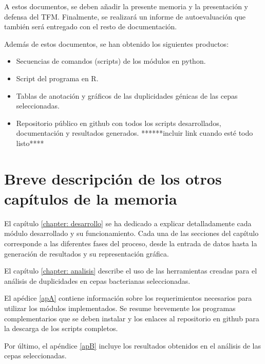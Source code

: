 A estos documentos, se deben añadir la presente memoria y la presentación y defensa del TFM. Finalmente, se realizará un informe de autoevaluación que también será entregado con el resto de documentación.

Además de estos documentos, se han obtenido los siguientes productos:

\begin{itemize}
    \item Secuencias de comandos (scripts) de los módulos en python.
    \item Script del programa en R.
    \item Tablas de anotación y gráficos de las duplicidades génicas de las cepas seleccionadas.
    \item Repositorio público en github con todos los scripts desarrollados, documentación y resultados generados. ******incluir link cuando esté todo listo****
\end{itemize}

\section{Breve descripción de los otros capítulos de la memoria}
El capítulo \ref{chapter: desarrollo} se ha dedicado a explicar detalladamente cada módulo desarrollado y su funcionamiento. Cada una de las secciones del capítulo corresponde a las diferentes fases del proceso, desde la entrada de datos hasta la generación de resultados y su representación gráfica.

El capítulo \ref{chapter: analisis} describe el uso de las herramientas creadas para el análisis de duplicidades en cepas bacterianas seleccionadas. 

El apédice \ref{apA} contiene información sobre los requerimientos necesarios para utilizar los módulos implementados. Se resume brevemente los programas complementarios que se deben instalar y los enlaces al repositorio en github para la descarga de los scripts completos.

Por último, el apéndice \ref{apB} incluye los resultados obtenidos en el análisis de las cepas seleccionadas.